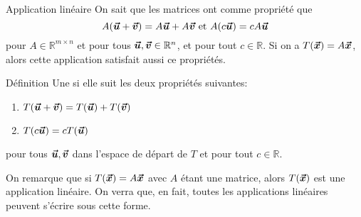 \documentclass{article}
\begin{document}
\begin{parag}{Application linéaire}
    On sait que les matrices ont comme propriété que
    \[A\left(\bvec{u} + \bvec{v}\right) = A \bvec{u} + A \bvec{v} \text{ et } A\left(c \bvec{u}\right) = c A \bvec{u}\]
    pour $A \in \mathbb{R}^{m \times n}$ et pour tous $\bm{\protect\vec{u}}, \bm{\protect\vec{v}} \in \mathbb{R}^{n}$, et pour tout $c \in \mathbb{R}$. Si on a $T\left(\bvec{x}\right) = A \bvec{x}$, alors cette application satisfait aussi ce propriétés.

    \begin{subparag}{Définition}
        Une  si elle suit les deux propriétés suivantes:
        \begin{enumerate}
            \item $T\left(\bvec{u} + \bvec{v}\right) = T\left(\bvec{u}\right) + T\left(\bvec{v}\right)$
            \item $T\left(c \bvec{u}\right) = cT\left(\bvec{u}\right)$
        \end{enumerate}
        pour tous $\bm{\protect\vec{u}}, \bm{\protect\vec{v}}$ dans l'espace de départ de $T$ et pour tout $c \in\mathbb{R}$.

        On remarque que si $T\left(\bvec{x}\right) = A \bvec{x}$ avec $A$ étant une matrice, alors $T\left(\bvec{x}\right)$ est une application linéaire. On verra que, en fait, toutes les applications linéaires peuvent s'écrire sous cette forme.
    \end{subparag}
\end{parag}
\end{document}
